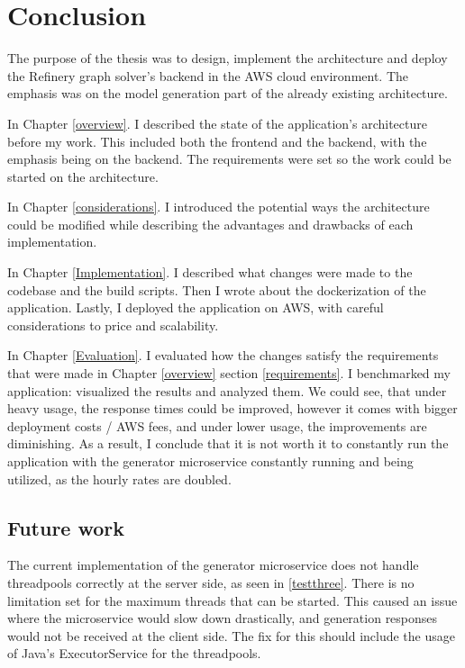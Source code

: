 \chapter{Conclusion} \label{Conclusion}

	The purpose of the thesis was to design, implement the architecture and deploy the Refinery graph solver's backend in the AWS cloud environment.
	The emphasis was on the model generation part of the already existing architecture.

	In Chapter \ref{overview}. I described the state of the application's architecture before my work. This included both the frontend and the backend, with
	the emphasis being on the backend. The requirements were set so the work could be started on the architecture.

	In Chapter \ref{considerations}. I introduced the potential ways the architecture could be modified while describing the advantages and drawbacks
	of each implementation.  

	In Chapter \ref{Implementation}. I described what changes were made to the codebase and the build scripts. Then I wrote about the dockerization 
	of the application. Lastly, I deployed the application on AWS, with careful considerations to price and scalability.

	In Chapter \ref{Evaluation}. I evaluated how the changes satisfy the requirements that were made in Chapter \ref{overview} section \ref{requirements}.
	I benchmarked
	my application: visualized the results and analyzed them. We could see, that under heavy usage, the response times could be improved, 
	however it comes with bigger deployment costs / AWS fees, and under lower usage, the improvements are diminishing. 
	As a result, I conclude that it is not worth it to constantly run the application with the 
	generator microservice constantly running and being utilized, as the hourly rates are doubled.

	\section{Future work}
		The current implementation of the generator microservice does not handle threadpools correctly at the server side, as seen in \ref{testthree}.
		There is no limitation set for the maximum threads that can be started.
		This caused an issue where the microservice would slow down drastically, and generation responses would not be received 
		at the client side. The fix for this should include the usage of Java's ExecutorService for the threadpools.

